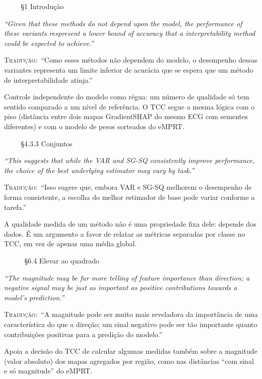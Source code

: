 \documentclass[11pt,a4paper]{article}
\newcommand{\pagechip}[1]{{\setlength{\fboxsep}{1.5pt}\colorbox{cAcc}{\textcolor{white}{\scriptsize\texttt{#1}}}}}
\newenvironment{origquote}{\par\itshape\small}{\par}
\newenvironment{tradquote}{\par\small\textsc{Tradução:}\ }{\par}
\newcommand{\explab}[1]{\par\smallskip{\small\color{cAcc}\textbf{\MakeUppercase{#1}}}\par}
\begin{document}
\begin{citacard}{\pagechip{p. 2} §1 Introdução}
\begin{origquote}“Given that these methods do not depend upon the model, the performance of these variants respresent a lower bound of accuracy that a interpretability method could be expected to achieve.”\end{origquote}
\begin{tradquote}“Como esses métodos não dependem do modelo, o desempenho dessas variantes representa um limite inferior de acurácia que se espera que um método de interpretabilidade atinja.”\end{tradquote}
\explab{Explicação}
Controle independente do modelo como régua: um número de qualidade só tem sentido comparado a um nível de referência. O TCC segue a mesma lógica com o piso (distância entre dois mapas GradientSHAP do mesmo ECG com sementes diferentes) e com o modelo de pesos sorteados do eMPRT.
\end{citacard}

\begin{citacard}{\pagechip{p. 9} §4.3.3 Conjuntos}
\begin{origquote}“This suggests that while the VAR and SG-SQ consistently improve performance, the choice of the best underlying estimator may vary by task.”\end{origquote}
\begin{tradquote}“Isso sugere que, embora VAR e SG-SQ melhorem o desempenho de forma consistente, a escolha do melhor estimador de base pode variar conforme a tarefa.”\end{tradquote}
\explab{Explicação}
A qualidade medida de um método não é uma propriedade fixa dele: depende dos dados. É um argumento a favor de relatar as métricas separadas por classe no TCC, em vez de apenas uma média global.
\end{citacard}

\begin{citacard}{\pagechip{p. 15} §6.4 Elevar ao quadrado}
\begin{origquote}“The magnitude may be far more telling of feature importance than direction; a negative signal may be just as important as positive contributions towards a model’s prediction.”\end{origquote}
\begin{tradquote}“A magnitude pode ser muito mais reveladora da importância de uma característica do que a direção; um sinal negativo pode ser tão importante quanto contribuições positivas para a predição do modelo.”\end{tradquote}
\explab{Explicação}
Apoia a decisão do TCC de calcular algumas medidas também sobre a magnitude (valor absoluto) dos mapas agregados por região, como nas distâncias “com sinal e só magnitude” do eMPRT.
\end{citacard}
\end{document}

